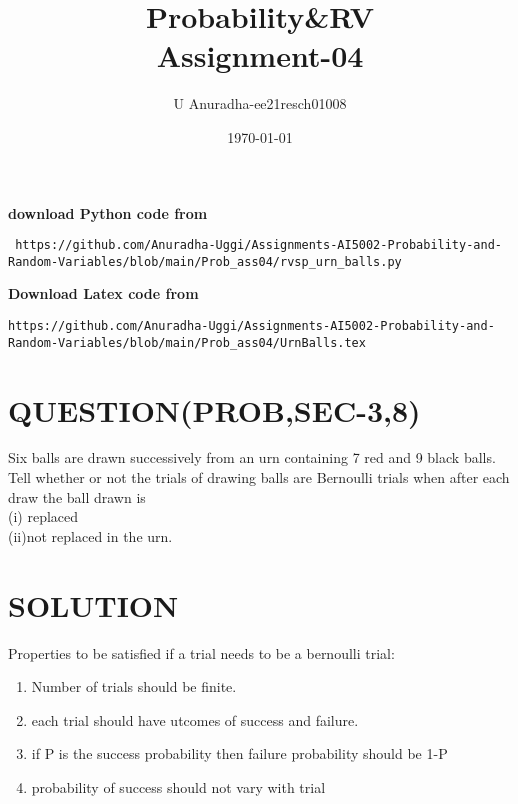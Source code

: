 \documentclass[journal,12pt,twocolumn]{IEEEtran}
\title{Probability\&RV \\ Assignment-04}
\author{U Anuradha-ee21resch01008}
\date{\today}
\begin{document}
\maketitle
\newpage
\bigskip
\renewcommand{\thefigure}{\theenumi}
\renewcommand{\thetable}{\theenumi}
\textbf{download Python code from}
\begin{lstlisting}
 https://github.com/Anuradha-Uggi/Assignments-AI5002-Probability-and-Random-Variables/blob/main/Prob_ass04/rvsp_urn_balls.py
\end{lstlisting}
\textbf{Download Latex code from}
\begin{lstlisting}
https://github.com/Anuradha-Uggi/Assignments-AI5002-Probability-and-Random-Variables/blob/main/Prob_ass04/UrnBalls.tex
\end{lstlisting}
\section{\textbf{QUESTION(PROB,SEC-3,8)}}
Six balls are drawn successively from an
urn containing 7 red and 9 black balls. Tell
whether or not the trials of drawing balls are
Bernoulli trials when after each draw the ball
drawn is\\
(i) replaced\\
(ii)not replaced in the urn.
\section{\textbf{SOLUTION}}
Properties to be satisfied if a trial needs to be a bernoulli trial:\\
\begin{enumerate}
    \item Number of trials should be finite.
    \item each trial should have utcomes of success and failure.\
    \item if P is the success probability then failure probability should be 1-P
    \item probability of success should not vary with trial
\end{enumerate}
\end{document}
